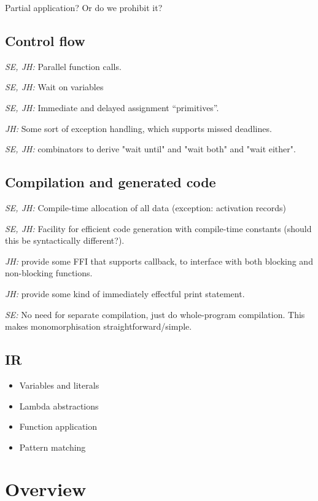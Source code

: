 \documentclass{article}
\begin{document}
Partial application?  Or do we prohibit it?

\subsection{Control flow}

\textit{SE, JH:} Parallel function calls.

\textit{SE, JH:} Wait on variables

\textit{SE, JH:} Immediate and delayed assignment ``primitives''.

\textit{JH:} Some sort of exception handling, which supports missed deadlines.

\textit{SE, JH:} combinators to derive "wait until" and "wait both" and "wait either".

\subsection{Compilation and generated code}

\textit{SE, JH:} Compile-time allocation of all data (exception: activation records)

\textit{SE, JH:} Facility for efficient code generation with compile-time
constants (should this be syntactically different?).

\textit{JH:} provide some FFI that supports callback, to interface with both
blocking and non-blocking functions.

\textit{JH:} provide some kind of immediately effectful print statement.

\textit{SE:} No need for separate compilation, just do whole-program
compilation. This makes monomorphisation straightforward/simple.

\subsection{IR}

\begin{itemize}
\item Variables and literals
\item Lambda abstractions
\item Function application
\item Pattern matching
\end{itemize}

\section{Overview}
\end{document}
